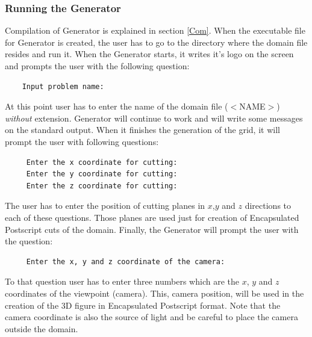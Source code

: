 \documentclass[10pt]{article}
\newcommand*{\tn}{\sffamily} %
\begin{document}
    \subsubsection{Running the {\tn Generator}}
    Compilation of {\tn Generator} is explained in section {\ref{Com}}.
    When the executable file for {\tn Generator} is created, the user
    has to go to the directory where the domain file resides and run
    it.
    When the {\tn Generator} starts, it writes it's logo on the screen
    and prompts the user with the
    following question:
    \small
    \begin{verbatim}
    Input problem name:
    \end{verbatim}
    \normalsize
    At this point user has to enter the name of the domain file
    ({\tn $<$NAME$>$}) {\em without} extension. {\tn Generator} will
    continue to work and will write some messages on the standard
    output. When it finishes the generation of the grid, it will
    prompt the user with following questions: 
    \small
    \begin{verbatim}
     Enter the x coordinate for cutting: 
     Enter the y coordinate for cutting: 
     Enter the z coordinate for cutting: 
    \end{verbatim}
    \normalsize
    The user has to enter the position of cutting planes in $x$,$y$
    and $z$ directions to each of these questions. Those planes 
    are used just for
    creation of Encapsulated Postscript cuts of the domain. 
    Finally, the {\tn Generator} will prompt the user with
    the question:
    \small
    \begin{verbatim}
     Enter the x, y and z coordinate of the camera: 
    \end{verbatim}
    \normalsize
    To that question user has to enter three numbers which
    are the $x$, $y$ and $z$ coordinates of the viewpoint
    (camera). This, camera position, will be used in the
    creation of the 3D figure in Encapsulated Postscript
    format. Note that the camera coordinate is also the
    source of light and be careful to place the camera
    outside the domain. 

\end{document}
